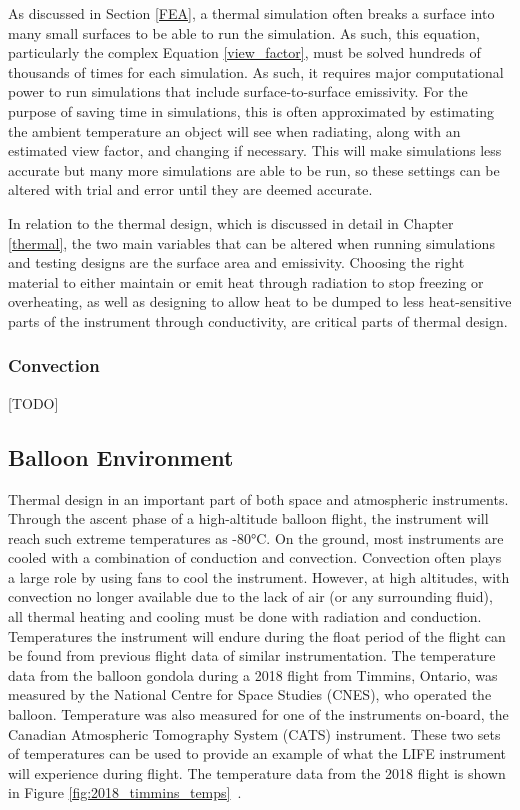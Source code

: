 As discussed in Section \ref{FEA}, a thermal simulation often breaks a surface into many small surfaces to be able to run the simulation. As such, this equation, particularly the complex Equation \ref{view_factor}, must be solved hundreds of thousands of times for each simulation. As such, it requires major computational power to run simulations that include surface-to-surface emissivity. For the purpose of saving time in simulations, this is often approximated by estimating the ambient temperature an object will see when radiating, along with an estimated view factor, and changing if necessary. This will make simulations less accurate but many more simulations are able to be run, so these settings can be altered with trial and error until they are deemed accurate.

 In relation to the thermal design, which is discussed in detail in Chapter \ref{thermal}, the two main variables that can be altered when running simulations and testing designs are the surface area and emissivity. Choosing the right material to either maintain or emit heat through radiation to stop freezing or overheating, as well as designing to allow heat to be dumped to less heat-sensitive parts of the instrument through conductivity, are critical parts of thermal design.

\subsubsection{Convection}
[TODO]

\subsection{Balloon Environment}
Thermal design in an important part of both space and atmospheric instruments. Through the ascent phase of a high-altitude balloon flight, the instrument will reach such extreme temperatures as -80°C. On the ground, most instruments are cooled with a combination of conduction and convection. Convection often plays a large role by using fans to cool the instrument. However, at high altitudes, with convection no longer available due to the lack of air (or any surrounding fluid), all thermal heating and cooling must be done with radiation and conduction. 
 Temperatures the instrument will endure during the float period of the flight can be found from previous flight data of similar instrumentation. The temperature data from the balloon gondola during a 2018 flight from Timmins, Ontario, was measured by the National Centre for Space Studies (CNES), who operated the balloon. Temperature was also measured for one of the instruments on-board, the Canadian Atmospheric Tomography System (CATS) instrument. These two sets of temperatures can be used to provide an example of what the LIFE instrument will experience during flight. The temperature data from the 2018 flight is shown in Figure \ref{fig:2018_timmins_temps}~\citep{CATS_report}. 
 
